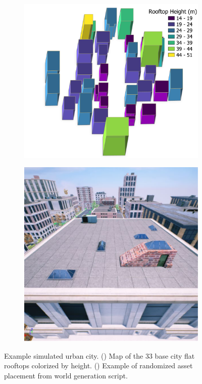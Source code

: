\begin{figure}[ht]
 \centering
  \begin{subfigure}{.40\linewidth}
    \centering\includegraphics[page=1, width=.99\linewidth]{chapter_6_landingsim/figs/rooftop-map-3d.pdf}
    \caption{\label{fig:ch6_map_base_a}}
  \end{subfigure}
  \begin{subfigure}{.34\linewidth}
    \centering\includegraphics[page=1, width=.99\linewidth]{chapter_6_landingsim/figs/HistogramRoof.pdf}
    \caption{\label{fig:ch6_map_base_b}}
  \end{subfigure}
  \caption[Example simulated urban city]{Example simulated urban city. () Map of the 33 base city flat rooftops colorized by height. () Example of randomized asset placement from world generation script.}\label{fig:ch6_map_base}
\end{figure}

